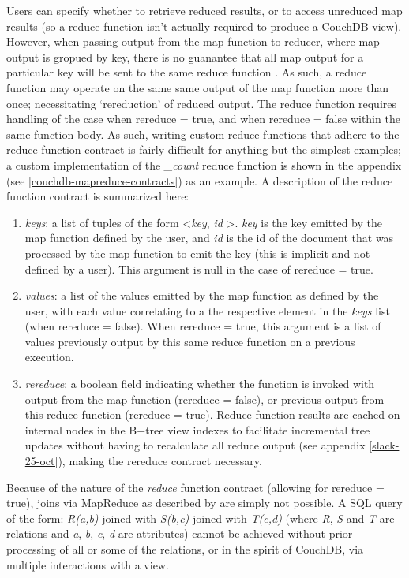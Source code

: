 Users can specify whether to retrieve reduced results, or to access unreduced map results (so a reduce function isn't actually required to produce a CouchDB view). However, when passing output from the map function to reducer, where map output is gropued by key, there is no guanantee that all map output for a particular key will be sent to the same reduce function \cite{reduceFunctions}. As such, a reduce function may operate on the same same output of the map function more than once; necessitating `rereduction' of reduced output. The reduce function requires handling of the case when rereduce = true, and when rereduce = false within the same function body. As such, writing custom reduce functions that adhere to the reduce function contract is fairly difficult for anything but the simplest examples; a custom implementation of the \textit{\_count} reduce function is shown in the appendix (see \ref{couchdb-mapreduce-contracts}) as an example. A description of the reduce function contract is summarized here:

\begin{enumerate}
  \item \textit{keys}: a list of tuples of the form \textless \textit{key}, \textit{id} \textgreater. \textit{key} is the key emitted by the map function defined by the user, and \textit{id} is the id of the document that was processed by the map function to emit the key (this is implicit and not defined by a user). This argument is null in the case of rereduce = true.
  \item \textit{values}: a list of the values emitted by the map function as defined by the user, with each value correlating to a the respective element in the \textit{keys} list (when rereduce = false). When rereduce = true, this argument is a list of values previously output by this same reduce function on a previous execution.
  \item \textit{rereduce}: a boolean field indicating whether the function is invoked with output from the map function (rereduce = false), or previous output from this reduce function (rereduce = true). Reduce function results are cached on internal nodes in the B+tree view indexes to facilitate incremental tree updates without having to recalculate all reduce output (see appendix \ref{slack-25-oct}), making the rereduce contract necessary.
\end{enumerate}

Because of the nature of the \textit{reduce} function contract (allowing for rereduce = true), joins via MapReduce as described by \cite{chandar2010} are simply not possible. A SQL query of the form: \textit{R(a,b)} joined with \textit{S(b,c)} joined with \textit{T(c,d)} (where \textit{R}, \textit{S} and \textit{T} are relations and \textit{a}, \textit{b}, \textit{c}, \textit{d} are attributes) cannot be achieved without prior processing of all or some of the relations, or in the spirit of CouchDB, via multiple interactions with a view.

